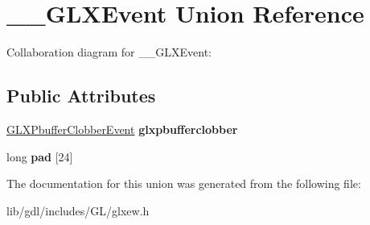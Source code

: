 \hypertarget{union_____g_l_x_event}{}\section{\+\_\+\+\_\+\+G\+L\+X\+Event Union Reference}
\label{union_____g_l_x_event}


Collaboration diagram for \+\_\+\+\_\+\+G\+L\+X\+Event\+:
\subsection*{Public Attributes}
\begin{DoxyCompactItemize}
\item 
\hypertarget{union_____g_l_x_event_ada5880e2b424bcb2f60a411aaf713fae}{}\hyperlink{struct_g_l_x_pbuffer_clobber_event}{G\+L\+X\+Pbuffer\+Clobber\+Event} {\bfseries glxpbufferclobber}\label{union_____g_l_x_event_ada5880e2b424bcb2f60a411aaf713fae}

\item 
\hypertarget{union_____g_l_x_event_a1cb8f6e7e77a34d25baf43b3f3bc2d4f}{}long {\bfseries pad} \mbox{[}24\mbox{]}\label{union_____g_l_x_event_a1cb8f6e7e77a34d25baf43b3f3bc2d4f}

\end{DoxyCompactItemize}


The documentation for this union was generated from the following file\+:\begin{DoxyCompactItemize}
\item 
lib/gdl/includes/\+G\+L/glxew.\+h\end{DoxyCompactItemize}
